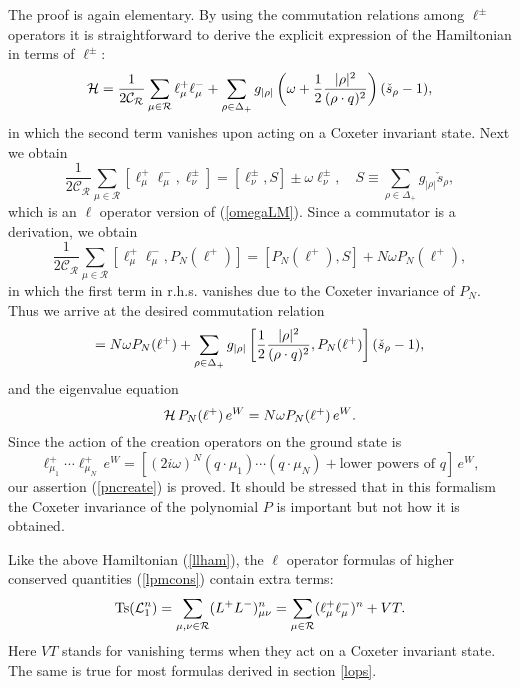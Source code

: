 \documentclass[a4paper,12pt]{article}
\begin{document}
The proof is again elementary.
By using the commutation relations among
\(\ell^\pm\) operators it is straightforward to derive the explicit
expression of the Hamiltonian  in terms of \(\ell^\pm\):
\begin{equation}
   {\cal
   H}=\frac{1}{2\mathcal{C_R}}
   \sum_{\mu\in\mathcal{R}}\ell^+_{\mu}\ell^-_{\mu}
   +
   \sum_{\rho\in\Delta_{+}}g_{|\rho|}\left(\omega
   +\frac{1}{2}{|\rho|^2\over{(\rho\cdot q)^2}}\right)(\check{s}_{\rho}-1),
   \label{llham}
\end{equation}
in which the second term vanishes upon acting on a
Coxeter invariant state.
Next we obtain
\begin{equation}
   \frac{1}{2\mathcal{C_R}}
   \sum_{\mu\in\mathcal{R}}[\ell^+_{\mu}\ell^-_{\mu},
   \ell_\nu^\pm]=[\ell_\nu^\pm,S]\pm\omega\ell_\nu^\pm,\quad
   S\equiv\sum_{\rho\in\Delta_+}g_{|\rho|}\check{s}_{\rho},
\end{equation}
which is an \(\ell\) operator version of (\ref{omegaLM}).
Since a commutator is a derivation, we obtain
\begin{equation}
   \frac{1}{2\mathcal{C_R}}
   \sum_{\mu\in\mathcal{R}}[\ell^+_{\mu}\ell^-_{\mu},
   P_N(\ell^+)]=[P_N(\ell^+),S]+N\omega P_N(\ell^+),
\end{equation}
in which the first term in r.h.s. vanishes due to the Coxeter invariance
of \(P_N\). Thus we arrive at the desired commutation relation
\begin{equation}
   [{\cal H}, P_N(\ell^+)]=N\omega P_N(\ell^+)+
   \sum_{\rho\in\Delta_{+}}g_{|\rho|}\left[
   \frac{1}{2}{|\rho|^2\over{(\rho\cdot
   q)^2}},P_N(\ell^+)\right](\check{s}_{\rho}-1),
\end{equation}
and the eigenvalue equation
\begin{equation}
   {\cal H}\,P_N(\ell^+)\,e^W=N\omega P_N(\ell^+)\,e^W.
\end{equation}
Since the action of the creation operators on the ground state is
\begin{equation}
   \ell_{\mu_1}^+\cdots\ell_{\mu_N}^+\,e^W=[
   (2i\omega)^N(q\cdot\mu_1)\cdots(q\cdot\mu_N)
   +\mbox{lower powers of } q]\,e^W,
\end{equation}
our assertion (\ref{pncreate}) is proved.
It should be stressed that in this formalism the Coxeter invariance of the
polynomial \(P\) is important but not how it is obtained.



Like the above Hamiltonian (\ref{llham}),  the \(\ell\) operator formulas
of higher conserved quantities (\ref{lpmcons}) contain extra terms:
\begin{equation}
   \mbox{Ts}({\cal L}_1^n)=\sum_{\mu,\nu\in{\cal
   R}}(L^+L^-)^n_{\mu\nu}=
   \sum_{\mu\in{\cal R}}(\ell_{\mu}^+\ell_{\mu}^-)^n+ VT.
\end{equation}
Here \(VT\) stands for vanishing terms when they act on a Coxeter invariant
state. The same is true for most formulas derived in section
\ref{lops}.
\end{document}

